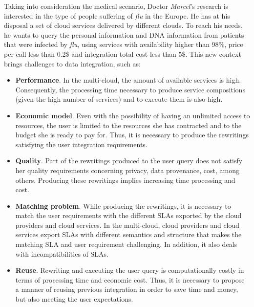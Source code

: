 Taking into consideration the medical scenario, Doctor \textit{Marcel}'s research is interested in the type of people suffering of \textit{flu} in the Europe. He has at his disposal a set of cloud services delivered by different clouds. To reach his needs, he wants to query the personal information and DNA information from patients that were infected by \textit{flu}, using services with availability higher than 98\%, price per call less than 0.2\$ and integration total cost less than 5\$. This new context brings challenges to data integration, such as:
\begin{itemize}
\item \textbf{Performance}. In the multi-cloud, the amount of available services is high. Consequently, the processing time necessary to produce service compositions (given the high number of services) and to execute them is also high.
\item \textbf{Economic model}. Even with the possibility of having an unlimited access to resources, the user is limited to the resources she has contracted and to the budget she is ready to pay for. Thus, it is necessary to produce the rewritings satisfying the user integration requirements. 
\item \textbf{Quality}. Part of the rewritings produced to the user query does not satisfy her quality requirements concerning privacy, data provenance, cost, among others. Producing these rewritings implies increasing time processing and cost. 
\item \textbf{Matching problem}. While producing the rewritings, it is necessary to match the user requirements with the different SLAs exported by the cloud providers and cloud services. In the multi-cloud, cloud providers and cloud services export SLAs with different semantics and structure that makes the matching SLA and user requirement challenging. In addition, it also deals with incompatibilities of SLAs.
\item \textbf{Reuse}. Rewriting and executing the user query is computationally costly in terms of processing time and economic cost. Thus, it is necessary to propose a manner of reusing previous integration in order to save time and money, but also meeting the user expectations.
\end{itemize}

